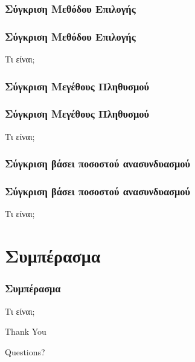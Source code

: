 \documentclass[xetex,mathserif,serif,14pt]{beamer}
\begin{document}
\subsubsection{Σύγκριση Μεθόδου Επιλογής}
\begin{frame}
\frametitle{Σύγκριση Μεθόδου Επιλογής}
Τι είναι;
\end{frame}

\subsubsection{Σύγκριση Μεγέθους Πληθυσμού}

\begin{frame}
\frametitle{Σύγκριση Μεγέθους Πληθυσμού}
Τι είναι;
\end{frame}

\subsubsection{Σύγκριση βάσει ποσοστού ανασυνδυασμού}

\begin{frame}
\frametitle{Σύγκριση βάσει ποσοστού ανασυνδυασμού}
Τι είναι;
\end{frame}

\section{Συμπέρασμα}

\begin{frame}
\frametitle{Συμπέρασμα}
Τι είναι;
\end{frame}


\begin{frame}

\Huge{\centerline{Thank You}}
\Large{\centerline{Questions?}}
\end{frame}

\end{document}
